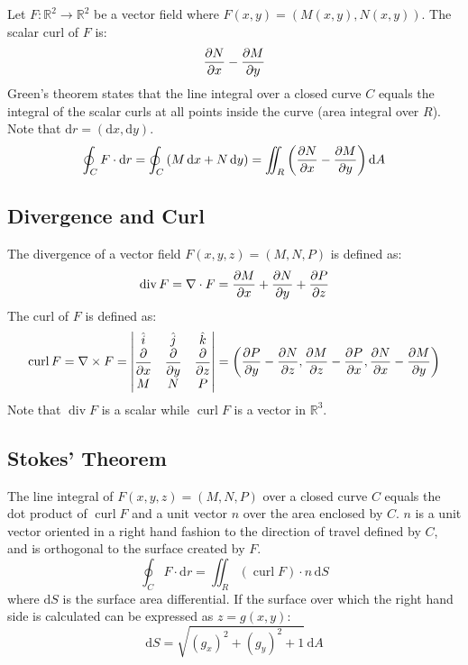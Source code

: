 \documentclass{article}
\DeclareMathOperator{\curl}{curl}
\DeclareMathOperator{\diverge}{div}
\begin{document}
Let $F:\mathbb R^2\to\mathbb R^2$ be a vector field where $F(x,y)=(M(x,y),N(x,y))$. The scalar curl of $F$ is:
\begin{equation*}
	\diffp Nx-\diffp My
\end{equation*}
Green's theorem states that the line integral over a closed curve $C$ equals the integral of the scalar curls at all points inside the curve (area integral over $R$). Note that $\mathrm{d}r=(\mathrm{d}x,\mathrm{d}y)$.
\begin{equation*}
    \oint_C F\cdot \mathrm{d}r
	=\oint_C \left( M \,\mathrm{d}x+N \,\mathrm{d}y \right)
	=\iint_R \left( \diffp Nx-\diffp My \right) \mathrm{d}A
\end{equation*}

\subsection{Divergence and Curl}

The divergence of a vector field $F(x,y,z)=(M,N,P)$ is defined as:
\begin{equation*}
	\diverge F
	=\nabla \cdot F
	=\diffp Mx+\diffp Ny+\diffp Pz
\end{equation*}
The curl of $F$ is defined as:
\begin{equation*}
    \curl F
	=\nabla \times F
	=\begin{vmatrix}
		\hat i & \hat j & \hat k \\
		\displaystyle\diffp{}x & \displaystyle\diffp{}y & \displaystyle\diffp{}z \\
		M & N & P
	\end{vmatrix}
	=\left( \diffp Py-\diffp Nz, \diffp Mz-\diffp Px, \diffp Nx-\diffp My \right)
\end{equation*}
Note that $\diverge F$ is a scalar while $\curl F$ is a vector in $\mathbb R^3$.

\subsection{Stokes' Theorem}

The line integral of $F(x,y,z)=(M,N,P)$ over a closed curve $C$ equals the dot product of $\curl F$ and a unit vector $n$ over the area enclosed by $C$. $n$ is a unit vector oriented in a right hand fashion to the direction of travel defined by $C$, and is orthogonal to the surface created by $F$.
\begin{equation*}
    \oint_C F\cdot \mathrm{d}r
	=\iint_R (\curl F)\cdot n \,\mathrm{d}S
\end{equation*}
where $\mathrm{d}S$ is the surface area differential. If the surface over which the right hand side is calculated can be expressed as $z=g(x,y)$:
\begin{equation*}
    \mathrm{d}S=\sqrt{(g_x)^2+(g_y)^2+1}\,\mathrm{d}A
\end{equation*}
\end{document}
